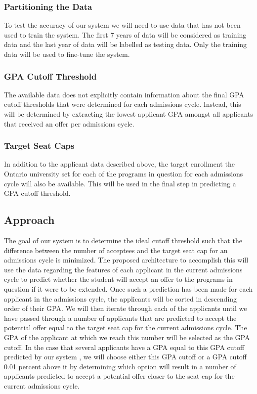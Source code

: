 \documentclass{article}
\begin{document}
\begin{normalsize}
        \subsubsection{Partitioning the Data}
        To test the accuracy of our system we will need to use data that has not been used to train the system. 
        The first 7 years of data will be considered as training data and the last year of data will be labelled as testing data. Only the training data will be used to fine-tune the system.
        
        \subsubsection{GPA Cutoff Threshold}
        The available data does not explicitly contain information about the final GPA cutoff thresholds that were determined for each admissions cycle. 
        Instead, this will be determined by extracting the lowest applicant GPA amongst all applicants that received an offer per admissions cycle.
        
        \subsubsection{Target Seat Caps}
         In addition to the applicant data described above, the target enrollment the Ontario university set for each of the programs in question for each admissions cycle will also be available. 
         This will be used in the final step in predicting a GPA cutoff threshold.
         
        \subsection{Approach}
            The goal of our system is to determine the ideal cutoff threshold such that the difference between the number of acceptees and the target seat cap for an admissions cycle is minimized. 
            The proposed architecture to accomplish this will use the data regarding the features of each applicant in the current admissions cycle to predict whether the student will accept an offer to the programs in question if it were to be extended. 
            Once such a prediction has been made for each applicant in the admissions cycle, the applicants will be sorted in descending order of their GPA. 
            We will then iterate through each of the applicants until we have passed through a number of applicants that are predicted to accept the potential offer equal to the target seat cap for the current admissions cycle. 
            The GPA of the applicant at which we reach this number will be selected as the GPA cutoff. 
            In the case that several applicants have a GPA equal to this GPA cutoff predicted by our system , we will choose either this GPA cutoff or a GPA cutoff 0.01 percent above it by determining which option will result in a number of applicants predicted to accept a potential offer closer to the seat cap for the current admissions cycle.


\end{normalsize}
\end{document}
